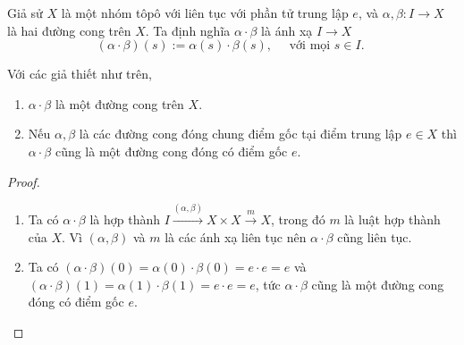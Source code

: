  Giả sử $X$ là một nhóm tôpô với liên tục với phần tử trung lập $e$, 
 và $\alpha,\beta:I\to X$ là hai đường cong trên $X$.
 Ta định nghĩa $\alpha \cdot \beta$ là ánh xạ $I \to X$
 \[
 (\alpha\cdot\beta)(s):=\alpha(s)\cdot \beta(s), \quad \text{ với mọi $s\in I$.
 }
 \]
\begin{lemma} \label{dot}Với các giả thiết như trên,
	\begin{enumerate}
		\item[(1)]  $\alpha \cdot \beta$ là một đường cong trên $X$.
		\item[(2)] Nếu $\alpha,\beta$ là các đường cong đóng chung điểm gốc tại điểm trung lập $e\in X$ thì $\alpha\cdot \beta$ cũng là một đường cong đóng có điểm gốc $e$. 
	\end{enumerate}
	\end{lemma}
	\begin{proof}
		\begin{enumerate}
			\item[(1)] Ta có  $\alpha \cdot \beta$ là hợp thành 
			$I\overset{(\alpha,\beta)}{\longrightarrow} X\times X\overset{m}{\longrightarrow}X$, trong đó $m$ là luật hợp thành của $X$. Vì $(\alpha,\beta)$ và $m$ là các ánh xạ liên tục nên $\alpha\cdot \beta$ cũng liên tục.
			\item[(2)] Ta có  $(\alpha\cdot\beta)(0)=\alpha(0)\cdot\beta(0)=e\cdot e=e$ và $(\alpha\cdot\beta)(1)=\alpha(1)\cdot\beta(1)=e\cdot e=e$, tức $\alpha\cdot \beta$ cũng là một đường cong đóng có điểm gốc $e$.
		\end{enumerate}
		\end{proof}

